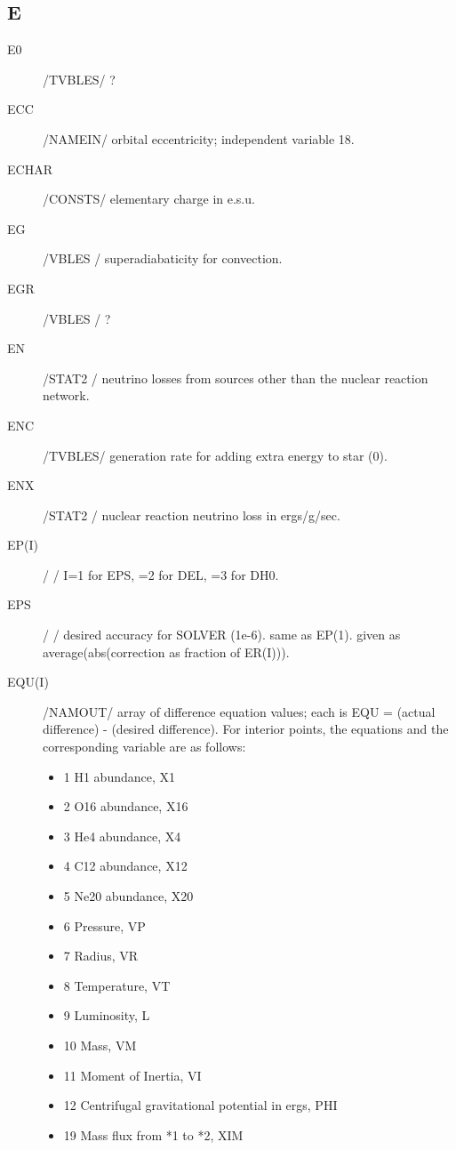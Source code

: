 \documentclass{article}
\begin{document}
\subsection*{E}
\begin{description}
    \item[E0]      	/TVBLES/  ?

	\item[ECC]		    /NAMEIN/ orbital eccentricity; independent variable 18.

	\item[ECHAR]		/CONSTS/ elementary charge in e.s.u.
    
	\item[EG]      	/VBLES / superadiabaticity for convection.

	\item[EGR]     	/VBLES /  ?
    
	\item[EN]		    /STAT2 / neutrino losses from sources other than the nuclear reaction network.

	\item[ENC]		    /TVBLES/ generation rate for adding extra energy to star (0).

	\item[ENX	]	    /STAT2 / nuclear reaction neutrino loss in ergs/g/sec.

	\item[EP(I)]     	/      / I=1 for EPS, =2 for DEL, =3 for DH0.
	
	\item[EPS]		    /      / desired accuracy for SOLVER (1e-6).  same as EP(1).
	                     given as average(abs(correction as fraction of ER(I))).

	\item[EQU(I)]		    /NAMOUT/ array of difference equation values; each is EQU = (actual difference) - (desired difference).  For interior points, the equations and the corresponding variable are as follows:
		\begin{itemize}
					\item 1	H1 abundance, X1
					\item 2	O16 abundance, X16
					\item 3	He4 abundance, X4
					\item 4	C12 abundance, X12
					\item 5	Ne20 abundance, X20
					\item 6	Pressure, VP
					\item 7	Radius, VR
					\item 8	Temperature, VT
					\item 9	Luminosity, L
					\item 10	Mass, VM
					\item 11	Moment of Inertia, VI
					\item 12	Centrifugal gravitational potential in ergs, PHI
					\item 19	Mass flux from *1 to *2, XIM
		\end{itemize}
					

\end{description}
\end{document}

